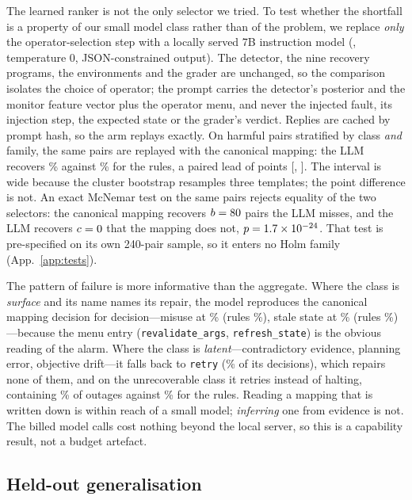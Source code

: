 The learned ranker is not the only selector we tried. To test whether the shortfall is a property of
our small model class rather than of the problem, we replace \emph{only} the operator-selection step
with a locally served 7B instruction model (\texttt{\LLMModel}, temperature 0, JSON-constrained
output). The detector, the nine recovery programs, the environments and the grader are unchanged, so
the comparison isolates the choice of operator; the prompt carries the detector's posterior and the
monitor feature vector plus the operator menu, and never the injected fault, its injection step, the
expected state or the grader's verdict. Replies are cached by prompt hash, so the arm replays exactly.
On \LLMPairs harmful pairs stratified by class \emph{and} family, the same pairs are replayed with
the canonical mapping: the LLM recovers \LLMRecovery\% against \LLMRuleRecovery\% for the rules, a
paired lead of \LLMPairedDelta{} points [\LLMPairedLo{}, \LLMPairedHi{}]. The interval is wide because
the cluster bootstrap resamples three templates; the point difference is not. An exact McNemar
test on the same \LLMPairs{} pairs rejects equality of the two selectors: the canonical mapping
recovers $b=80$ pairs the LLM misses, and the LLM recovers $c=0$ that the
mapping does not, $p=1.7\times10^{-24}$. That test is pre-specified on its own 240-pair sample, so it
enters no Holm family (App.~\ref{app:tests}).

The pattern of failure is more informative than the aggregate. Where the class is \emph{surface} and
its name names its repair, the model reproduces the canonical mapping decision for decision---misuse
at \LLMMisuse\% (rules \LLMRuleMisuse\%), stale state at \LLMStale\% (rules \LLMRuleStale\%)---because
the menu entry (\texttt{revalidate\_args}, \texttt{refresh\_state}) is the obvious reading of the
alarm. Where the class is \emph{latent}---contradictory evidence, planning error, objective
drift---it falls back to \texttt{retry} (\LLMRetryPct\% of its \LLMDecisions{} decisions), which
repairs none of them, and on the unrecoverable class it retries instead of halting, containing
\LLMContainment\% of outages against \LLMRuleContainment\% for the rules. Reading a mapping that is
written down is within reach of a small model; \emph{inferring} one from evidence is not. The
\LLMCalls{} billed model calls cost nothing beyond the local server, so this is a capability result,
not a budget artefact.

\subsection{Held-out generalisation}

